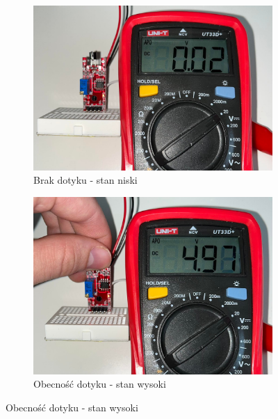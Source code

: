 \documentclass[11pt, a4paper]{article}
\begin{document}
\vspace{0.25cm}
\begin{figure}[h]
\centering
\begin{subfigure}{.5\textwidth}
\centering
\includegraphics[width=.9\linewidth]{fig/KY-036/283758226_769757180846069_2450086641381727927_n}
\caption{Brak dotyku - stan niski}
\label{fig:_uklad_woltomierz_otw}
\end{subfigure}%
\begin{subfigure}{.5\textwidth}
\centering
\includegraphics[width=.9\linewidth]{fig/KY-036/281631346_529764192182061_5396655729694026560_n}
\caption{Obecność dotyku - stan wysoki}
\label{fig:_uklad_woltomierz_zmk}
\end{subfigure}
\label{fig:woltomierz}
\end{figure}
\vspace{0.25cm}
\end{document}
